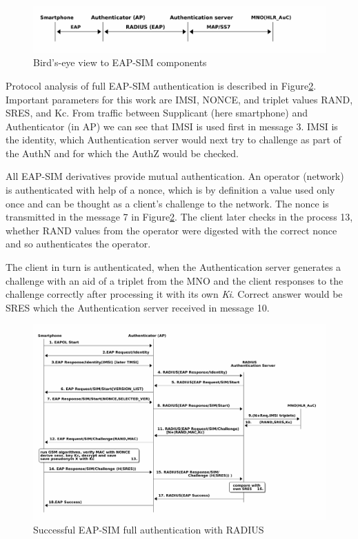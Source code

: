 \documentclass[12pt,a4paper,english]{tutthesis}
\begin{document}
\begin{otherlanguage}{english}
\begin{figure}[htb]
\centering
\includegraphics[width=.9\linewidth]{eap-sim-bird.png}
\caption{\label{fig:eap-sim-bird}Bird's-eye view to EAP-SIM components}
\end{figure}





Protocol analysis of full EAP-SIM authentication is described 
in Figure\ref{fig:eap-sim-radius}.
Important parameters for this work are IMSI, NONCE, and triplet values
RAND, SRES, and Kc. 
From traffic between Supplicant (here smartphone) and Authenticator (in AP)
we can see that IMSI is used first in message 3. IMSI is the
identity, which Authentication server would next try to challenge as
part of the AuthN and for which the AuthZ would be checked.







All EAP-SIM derivatives provide mutual authentication.
An operator (network) is authenticated with help of a nonce,
which is by definition a value used only once and can
be thought as a client's challenge to the network.
The nonce is transmitted in the message 7 in Figure\ref{fig:eap-sim-radius}.
The client later checks in the process 13, whether RAND values from
the operator were digested with the correct nonce and so authenticates
the operator.

The client in turn is authenticated, when the Authentication server
generates a challenge with an aid of a triplet from the MNO and the
client responses to the challenge correctly after processing it with
its own \emph{Ki}.  Correct answer would be SRES which the Authentication
server received in message 10.
\begin{figure}[htb]
\centering
\includegraphics[width=.9\linewidth]{eap-sim-radius.png}
\caption{\label{fig:eap-sim-radius}Successful EAP-SIM full authentication with RADIUS}
\end{figure}




\end{otherlanguage}
\end{document}
